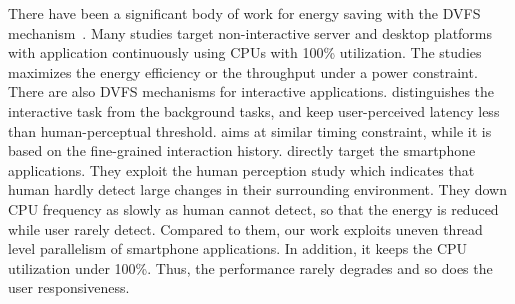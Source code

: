 There have been a significant body of work for energy saving with the DVFS mechanism~\cite{micro06DVFS, decomposition, Koala, isca11DVFS, packandcap}. 
Many studies target non-interactive server and desktop platforms with application continuously using CPUs with 100\% utilization.
The studies maximizes the energy efficiency or the throughput under a power constraint.
There are also DVFS mechanisms for interactive applications.
\cite{transactionbased} distinguishes the interactive task from the background tasks,
and keep user-perceived latency less than human-perceptual threshold.
\cite{IADVS} aims at similar timing constraint, 
while it is based on the fine-grained interaction history.
\cite{intothewild} directly target the smartphone applications.
They exploit the human perception study 
which indicates that human hardly detect large changes in their surrounding environment.
They down CPU frequency as slowly as human cannot detect, so that the energy is reduced while user rarely detect.
Compared to them, our work exploits uneven thread level parallelism of smartphone applications.
In addition, it keeps the CPU utilization under 100\%.
Thus, the performance rarely degrades and so does the user responsiveness.
